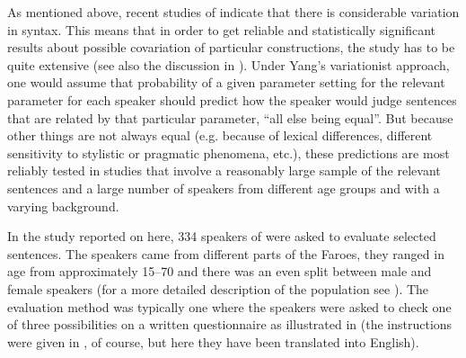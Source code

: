 \documentclass[output=paper]{LSP/langsci}
\begin{document}
As mentioned above, recent studies of  indicate that there is considerable variation in  syntax. This means that in order to get reliable and statistically significant results about possible covariation of particular constructions, the study has to be quite extensive (see also the discussion in \citealt{Thrainsson2017}). Under Yang’s variationist approach, one would assume that probability of a given parameter setting for the relevant parameter for each speaker should predict how the speaker would judge sentences that are related by that particular parameter, “all else being equal”. But because other things are not always equal (e.g. because of lexical differences, different sensitivity to stylistic or pragmatic phenomena, etc.), these predictions are most reliably tested in studies that involve a reasonably large sample of the relevant sentences and a large number of speakers from different age groups and with a varying background.

In the study reported on here, 334 speakers of  were asked to evaluate selected sentences. The speakers came from different parts of the Faroes, they ranged in age from approximately 15--70 and there was an even split between male and female speakers (for a more detailed description of the population see \citealt{Thrainsson2017}). The evaluation method was typically one where the speakers were asked to check one of three possibilities on a written questionnaire as illustrated in  (the instructions were given in , of course, but here they have been translated into English).
\end{document}
